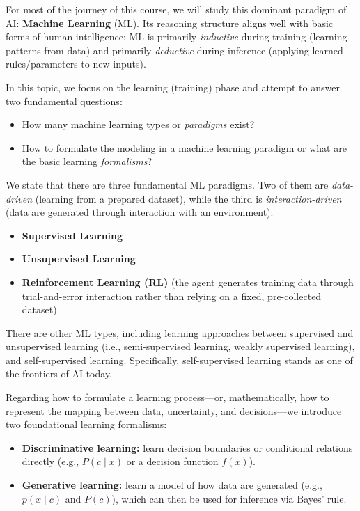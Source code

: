 \documentclass[12pt]{article}
\begin{document}
For most of the journey of this course, we will study this dominant paradigm of AI: \textbf{Machine Learning} (ML). Its reasoning structure aligns well with basic forms of human intelligence: ML is primarily \emph{inductive} during training (learning patterns from data) and primarily \emph{deductive} during inference (applying learned rules/parameters to new inputs).

In this topic, we focus on the learning (training) phase and attempt to answer two fundamental questions:

\begin{itemize}
\item How many machine learning types or \textit{paradigms} exist?
\item How to formulate the modeling in a machine learning paradigm or what are the basic learning \textit{formalisms}?
\end{itemize}

We state that there are three fundamental ML paradigms. Two of them are \emph{data-driven} (learning from a prepared dataset), while the third is \emph{interaction-driven} (data are generated through interaction with an environment):
\begin{itemize}
\item \textbf{Supervised Learning}
\item \textbf{Unsupervised Learning}
\item \textbf{Reinforcement Learning (RL)} (the agent generates training data through trial-and-error interaction rather than relying on a fixed, pre-collected dataset)
\end{itemize}
There are other ML types, including learning approaches between supervised and unsupervised learning (i.e., semi-supervised learning, weakly supervised learning), and self-supervised learning. Specifically, self-supervised learning stands as one of the frontiers of AI today. 

Regarding how to formulate a learning process—or, mathematically, how to represent the mapping between data, uncertainty, and decisions—we introduce two foundational learning formalisms:
\begin{itemize}
\item \textbf{Discriminative learning:} learn decision boundaries or conditional relations directly (e.g., $P(c\mid x)$ or a decision function $f(x)$).
\item \textbf{Generative learning:} learn a model of how data are generated (e.g., $p(x\mid c)$ and $P(c)$), which can then be used for inference via Bayes' rule.
\end{itemize}
\end{document}
